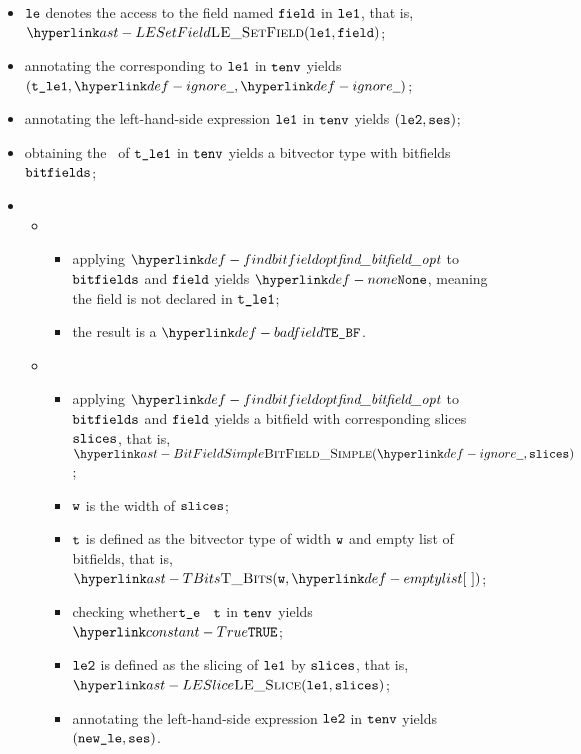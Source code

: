 \ProseParagraph
\AllApply
\begin{itemize}
  \item $\texttt{le}$ denotes the access to the field named $\texttt{field}$ in $\texttt{le1}$, that is, \\ $\LESetField(\vleone, \vfield)$;
  \item annotating the \rhsexpression{} corresponding to $\texttt{le1}$ in $\texttt{tenv}$ yields \\ $(\vtleone, \Ignore, \Ignore)$\ProseOrTypeError;
  \item annotating the left-hand-side expression $\texttt{le1}$ in $\texttt{tenv}$ yields $(\texttt{le2}, \texttt{ses})$\ProseOrTypeError;
  \item obtaining the \underlyingtypeterm\ of $\texttt{t\_le1}$ in $\texttt{tenv}$ yields a bitvector type with bitfields $\texttt{bitfields}$\ProseOrTypeError;
  \item \OneApplies
  \begin{itemize}
    \item {}
    \begin{itemize}
      \item applying $\findbitfieldopt$ to $\texttt{bitfields}$ and $\texttt{field}$ yields $\None$, meaning the field is not declared
            in $\texttt{t\_le1}$;
      \item the result is a \typingerrorterm{} $\BadField$.
    \end{itemize}

    \item {}
    \begin{itemize}
      \item applying $\findbitfieldopt$ to $\texttt{bitfields}$ and $\texttt{field}$ yields a bitfield with corresponding slices $\texttt{slices}$,
            that is, $\BitFieldSimple(\Ignore, \slices)$;
      \item $\texttt{w}$ is the width of $\texttt{slices}$;
      \item $\texttt{t}$ is defined as the bitvector type of width $\texttt{w}$ and empty list of bitfields, that is, $\TBits(\vw, \emptylist)$;
      \item checking whether$\texttt{t\_e}$ \typesatisfiesterm\ $\texttt{t}$ in $\texttt{tenv}$ yields $\True$\ProseOrTypeError;
      \item $\texttt{le2}$ is defined as the slicing of $\texttt{le1}$ by $\texttt{slices}$, that is, \\ $\LESlice(\vleone, \slices)$;
      \item annotating the left-hand-side expression $\texttt{le2}$ in $\texttt{tenv}$ yields \\ $(\texttt{new\_le}, \texttt{ses})$\ProseOrTypeError.
    \end{itemize}


\end{itemize}
\end{itemize}
